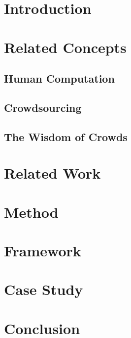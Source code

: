 \documentclass[sigconf]{acmart}
\begin{document}
\maketitle

\section{Introduction}
	

\section{Related Concepts}
	

	\subsection{Human Computation}
	

	\subsection{Crowdsourcing}
	

	\subsection{The Wisdom of Crowds}
	
	
\section{Related Work}
	

\section{Method} 
	

\section{Framework}
	


\section{Case Study}
	


\pagebreak

\section{Conclusion}
	

\pagebreak

\begin{acks}
	
\end{acks}


 
\end{document}
